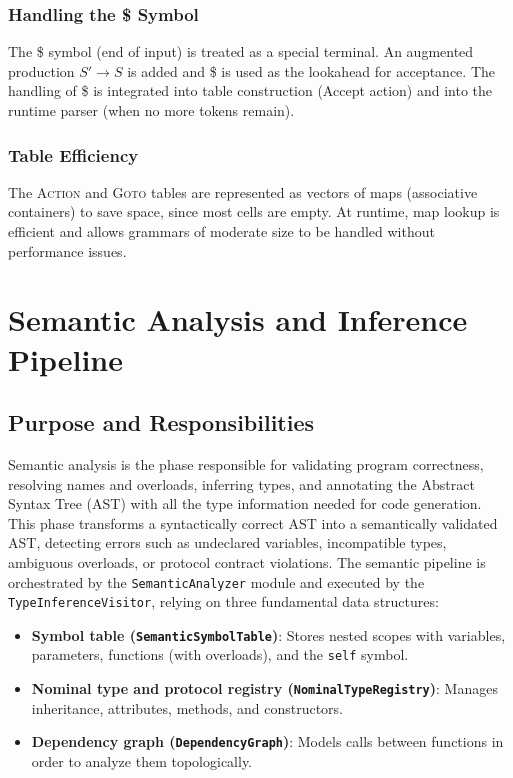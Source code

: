 \documentclass[12pt,a4paper]{report}
\begin{document}
\subsection{Handling the \$ Symbol}
The \$ symbol (end of input) is treated as a special terminal.
An augmented production $S' \to S$ is added and
 \$ is used as the lookahead for acceptance.
The handling of \$ is integrated into table construction
  (Accept action) and into the runtime parser (when no more tokens remain).

\subsection{Table Efficiency}
The \textsc{Action} and \textsc{Goto} tables are represented as vectors of maps (associative containers) to save space,
 since most cells are empty.
At runtime, map lookup is efficient
  and allows grammars of moderate size to be handled without performance issues.

\chapter{Semantic Analysis and Inference Pipeline}

\section{Purpose and Responsibilities}

Semantic analysis is the phase responsible for validating program correctness, resolving names and overloads, inferring types, and annotating the Abstract Syntax Tree (AST) with all the type information needed for code generation.
This phase transforms a syntactically correct AST into a semantically validated AST, detecting errors such as undeclared variables, incompatible types, ambiguous overloads, or protocol contract violations.
The semantic pipeline is orchestrated by the \texttt{SemanticAnalyzer} module and executed by the \texttt{TypeInferenceVisitor}, relying on three fundamental data structures:

\begin{itemize}
    \item \textbf{Symbol table (\texttt{SemanticSymbolTable})}: Stores nested scopes with variables, parameters, functions (with overloads), and the \texttt{self} symbol.
    \item \textbf{Nominal type and protocol registry (\texttt{NominalTypeRegistry})}: Manages inheritance, attributes, methods, and constructors.
    \item \textbf{Dependency graph (\texttt{DependencyGraph})}: Models calls between functions in order to analyze them topologically.
\end{itemize}
\end{document}
